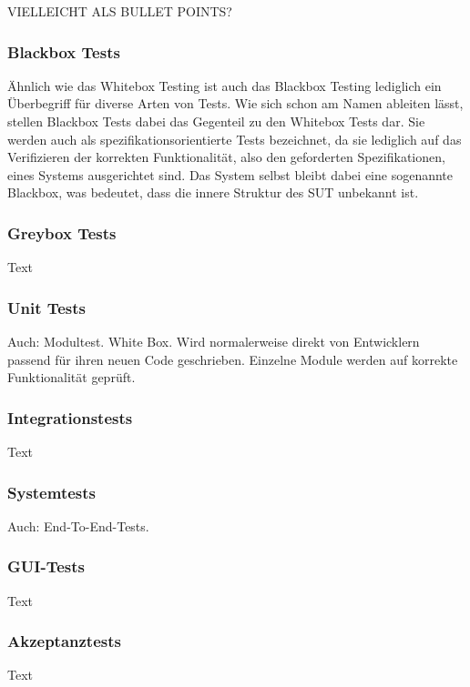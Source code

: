 VIELLEICHT ALS BULLET POINTS?

\subsubsection*{Blackbox Tests}\label{subsubsec:blackbox}
Ähnlich wie das Whitebox Testing ist auch das Blackbox Testing lediglich ein Überbegriff für diverse Arten von Tests. Wie sich schon am Namen ableiten lässt, stellen Blackbox Tests dabei das Gegenteil zu den Whitebox Tests dar. Sie werden auch als spezifikationsorientierte Tests bezeichnet, da sie lediglich auf das Verifizieren der korrekten Funktionalität, also den geforderten Spezifikationen, eines Systems ausgerichtet sind. Das System selbst bleibt dabei eine sogenannte Blackbox, was bedeutet, dass die innere Struktur des \ac{SUT} unbekannt ist. \cite[S. 120f.]{oregan:2019}

\subsubsection*{Greybox Tests}\label{subsubsec:greybox}
Text

\subsubsection*{Unit Tests}\label{subsubsec:unittest}
Auch: Modultest. White Box. Wird normalerweise direkt von Entwicklern passend für ihren neuen Code geschrieben. Einzelne Module werden auf korrekte Funktionalität geprüft. \cite[S. 75]{witte:2019}

\subsubsection*{Integrationstests} \label{subsubsec:integrationstests}
Text

\subsubsection*{Systemtests}\label{subsubsec:e2etests}
Auch: End-To-End-Tests.

\subsubsection*{GUI-Tests}\label{subsubsec:guitests}
Text

\subsubsection*{Akzeptanztests}\label{subsubsec:akzeptanztests}
Text

